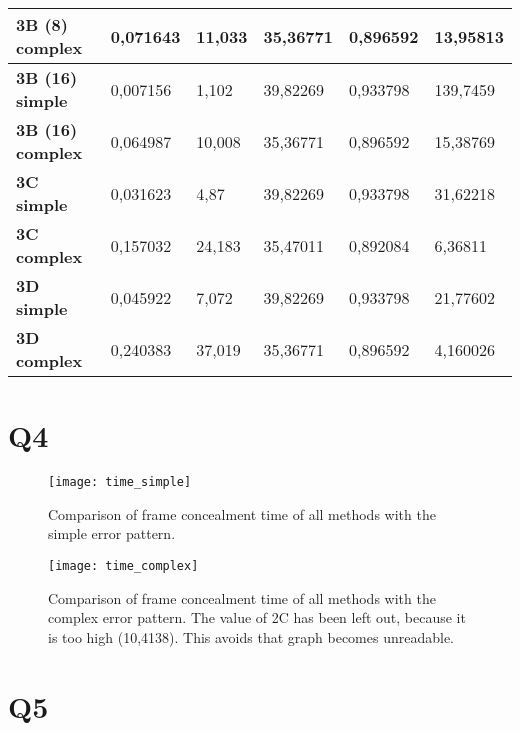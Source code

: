 \begin{appendices}
\begin{table}[h]
\begin{tabular}{|l|l|l|l|l|l|}
\textbf{3B (8) complex}  & 0,071643               & 11,033         & 35,36771      & 0,896592      & 13,95813           \\ \hline
\textbf{3B (16) simple}  & 0,007156               & 1,102          & 39,82269      & 0,933798      & 139,7459           \\ \hline
\textbf{3B (16) complex} & 0,064987               & 10,008         & 35,36771      & 0,896592      & 15,38769           \\ \hline
\textbf{3C simple}       & 0,031623               & 4,87           & 39,82269      & 0,933798      & 31,62218           \\ \hline
\textbf{3C complex}      & 0,157032               & 24,183         & 35,47011      & 0,892084      & 6,36811            \\ \hline
\textbf{3D simple}       & 0,045922               & 7,072          & 39,82269      & 0,933798      & 21,77602           \\ \hline
\textbf{3D complex}      & 0,240383               & 37,019         & 35,36771      & 0,896592      & 4,160026           \\ \hline
\end{tabular}
\end{table}

\newpage

\section{Q4}\label{app:Q4}

\begin{figure}[!h]\label{fig:time_simple_pattern}
  \centering
  \texttt{[image: time\_simple]}
  \caption{Comparison of frame concealment time of all methods with the simple error pattern.} 
\end{figure}

\begin{figure}[!h]\label{fig:time_complex_pattern}
  \centering
  \texttt{[image: time\_complex]}
  \caption{Comparison of frame concealment time of all methods with the complex error pattern. The value of 2C has been left out, because it is too high (10,4138). This avoids that graph becomes unreadable.} 
\end{figure}

\newpage

\section{Q5}\label{Q5}

\end{appendices}
